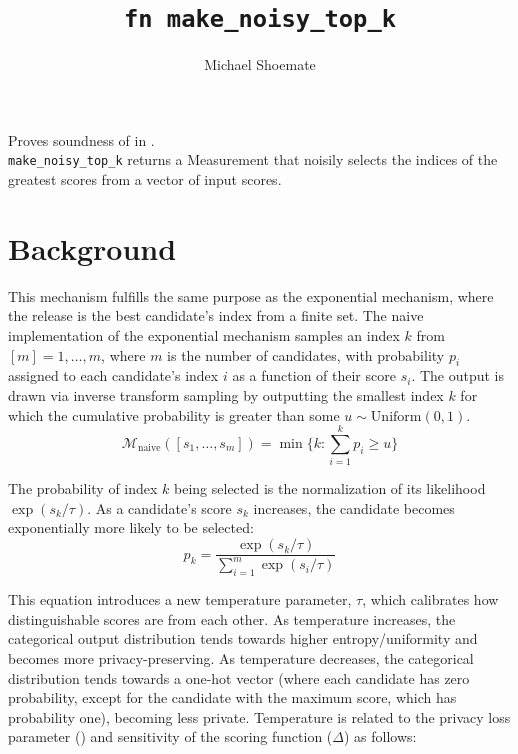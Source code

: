 \documentclass{article}
\title{\texttt{fn make\_noisy\_top\_k}}
\author{Michael Shoemate}
\begin{document}
  
\maketitle 
 
Proves soundness of   
in .\\ 
\texttt{make\_noisy\_top\_k} returns a Measurement that  
noisily selects the indices of the greatest scores from a vector of input scores. 

\section{Background}
This mechanism fulfills the same purpose as the exponential mechanism, 
where the release is the best candidate's index from a finite set.
The naive implementation of the exponential mechanism samples an index $k$ from $[m] = {1, \ldots, m}$, 
where $m$ is the number of candidates,
with probability $p_i$ assigned to each candidate's index $i$ as a function of their score $s_i$.
The output is drawn via inverse transform sampling
by outputting the smallest index $k$ for which the cumulative probability is greater than some $u \sim \mathrm{Uniform}(0, 1)$. 
\begin{equation}  
    \label{m-naive}  
    \mathcal{M}_{\mathrm{naive}}([s_1, \ldots, s_m]) = \min \{k: \sum_{i=1}^k p_i \ge u \}
\end{equation}
 
The probability of index $k$ being selected is the normalization of its likelihood $\exp(s_k / \tau)$. 
As a candidate's score $s_k$ increases, the candidate becomes exponentially more likely to be selected:
\begin{equation} 
    \label{prob-of-k} 
    p_k = \frac{\exp(s_k / \tau)}{\sum_{i = 1}^m \exp(s_i / \tau)} 
\end{equation} 
 
This equation introduces a new temperature parameter, $\tau$, 
which calibrates how distinguishable scores are from each other. 
As temperature increases, the categorical output distribution tends towards higher entropy/uniformity and becomes more privacy-preserving. 
As temperature decreases, the categorical distribution tends towards a one-hot vector 
(where each candidate has zero probability, except for the candidate with the maximum score, which has probability one), 
becoming less private. 
Temperature is related to the privacy loss parameter (\dout) and sensitivity of the scoring function ($\Delta$) as follows: 
 
\end{document}
